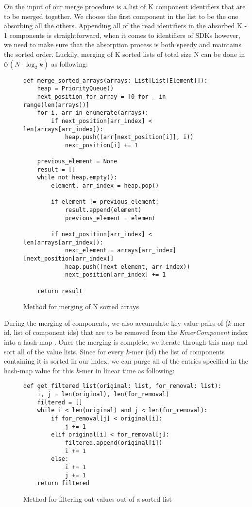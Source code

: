 On the input of our merge procedure is a list of K component identifiers that are to be merged together. We choose the first component in the list to be the one absorbing all the others. Appending all of the read identifiers in the absorbed K - 1 components is straightforward, when it comes to identifiers of SDKs however, we need to make sure that the absorption process is both speedy and maintains the sorted order. Luckily, merging of K sorted lists of total size N can be done in $\mathcal{O}(N \cdot \log_2 k)$ as following:

\begin{figure}[H]
\lstset{language=Python}
\begin{lstlisting}[basicstyle=\small]
def merge_sorted_arrays(arrays: List[List[Element]]):
    heap = PriorityQueue()
    next_position_for_array = [0 for _ in range(len(arrays))]
    for i, arr in enumerate(arrays):
        if next_position[arr_index] < len(arrays[arr_index]):
            heap.push((arr[next_position[i]], i))
            next_position[i] += 1

    previous_element = None
    result = []
    while not heap.empty():
        element, arr_index = heap.pop()

        if element != previous_element:
            result.append(element)
            previous_element = element

        if next_position[arr_index] < len(arrays[arr_index]):
            next_element = arrays[arr_index][next_position[arr_index]]
            heap.push((next_element, arr_index))
            next_position[arr_index] += 1

    return result
\end{lstlisting}
\caption{Method for merging of N sorted arrays}
\label{fig:merge_sorted}
\end{figure}

During the merging of components, we also accumulate key-value pairs of ($k$-mer id, list of component ids) that are to be removed from the \textit{KmerComponent} index into a hash-map . Once the merging is complete, we iterate through this map and sort all of the value lists.
Since for every $k$-mer (id) the list of components containing it is sorted in our index, we can purge all of the entries specified in the hash-map value for this $k$-mer in linear time as following:

\begin{figure}[H]
\lstset{language=Python}
\begin{lstlisting}[basicstyle=\small]
def get_filtered_list(original: list, for_removal: list):
    i, j = len(original), len(for_removal)
    filtered = []
    while i < len(original) and j < len(for_removal):
        if for_removal[j] < original[i]:
            j += 1
        elif original[i] < for_removal[j]:
            filtered.append(original[i])
            i += 1
        else:
            i += 1
            j += 1
    return filtered
\end{lstlisting}
\caption{Method for filtering out values out of a sorted list}
\label{fig:merge_sorted}
\end{figure}

